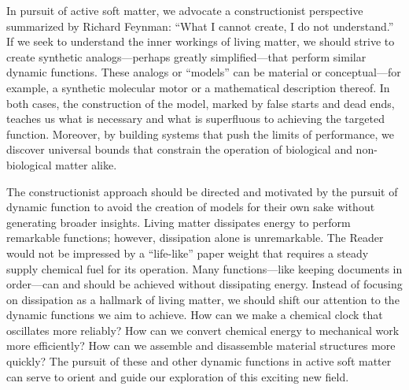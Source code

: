 \begin{appendices}
In pursuit of active soft matter, we advocate a constructionist perspective summarized by Richard Feynman: ``What I cannot create, I do not understand.'' If we seek to understand the inner workings of living matter, we should strive to create synthetic analogs---perhaps greatly simplified---that perform similar dynamic functions. These analogs or ``models'' can be material or conceptual---for example, a synthetic molecular motor or a mathematical description thereof.  In both cases, the construction of the model, marked by false starts and dead ends, teaches us what is necessary and what is superfluous to achieving the targeted function.  Moreover, by building systems that push the limits of performance, we discover universal bounds that constrain the operation of biological and non-biological matter alike.

The constructionist approach should be directed and motivated by the pursuit of dynamic function to avoid the creation of models for their own sake without generating broader insights.  Living matter dissipates energy to perform remarkable functions; however, dissipation alone is unremarkable. The Reader would not be impressed by a ``life-like'' paper weight that requires a steady supply chemical fuel for its operation. Many functions---like keeping documents in order---can and should be achieved without dissipating energy. Instead of focusing on dissipation as a hallmark of living matter, we should shift our attention to the dynamic functions we aim to achieve.  How can we make a chemical clock that oscillates more reliably?  How can we convert chemical energy to mechanical work more efficiently?  How can we assemble and disassemble material structures more quickly?  The pursuit of these and other dynamic functions in active soft matter can serve to orient and guide our exploration of this exciting new field.


\end{appendices}
